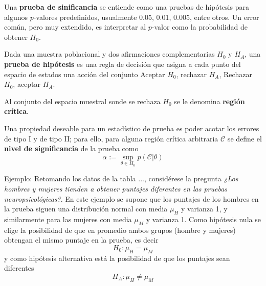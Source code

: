 Una \textbf{prueba de sinificancia} se entiende como una pruebas de hipótesis para algunos $p$-valores predefinidos, usualmente 0.05, 0.01, 0.005, entre otros.
%
Un error común, pero muy extendido, es interpretar al $p$-valor como la probabilidad de obtener $H_0$.

\begin{definicion}
Dada una muestra poblacional y dos afirmaciones complementarias $H_0$ y $H_A$, una \textbf{prueba de hipótesis} es una regla de decisión que asigna a cada punto del espacio de estados una acción del conjunto Aceptar $H_0$, rechazar $H_A$, Rechazar $H_0$, aceptar $H_A$.

Al conjunto del espacio muestral sonde se rechaza $H_0$ se le denomina \textbf{región crítica}. 
\end{definicion}

Una propiedad deseable para un estadístico de prueba es poder acotar los errores de tipo I y de tipo II; para ello, para alguna región crítica arbitraria $\mathcal{C}$ se define el \textbf{nivel de significancia} de la prueba como
\begin{equation}
\alpha := \sup_{\theta \in H_0} p(\mathcal{C} \lvert \theta)
\end{equation}

Ejemplo:
Retomando los datos de la tabla ..., considérese la pregunta \textit{¿Los hombres y mujeres tienden
a obtener puntajes diferentes en las pruebas neuropsicológicas?}. 
%
En este ejemplo se supone que los puntajes de los hombres en la prueba siguen una distribución normal con media $\mu_H$ y varianza 1, y similarmente para las mujeres con media $\mu_M$ y varianza 1.
%
Como hipótesis nula se elige la posibilidad de que en promedio ambos grupos (hombre y mujeres) obtengan el mismo puntaje en la prueba, es decir
\begin{equation}
H_0 : \mu_H = \mu_M
\end{equation}
y como hipótesis alternativa está la posibilidad de que los puntajes sean diferentes
\begin{equation}
H_A : \mu_H \neq \mu_M
\end{equation}

%

